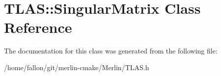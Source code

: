 \hypertarget{classTLAS_1_1SingularMatrix}{}\section{T\+L\+AS\+:\+:Singular\+Matrix Class Reference}
\label{classTLAS_1_1SingularMatrix}


The documentation for this class was generated from the following file\+:\begin{DoxyCompactItemize}
\item 
/home/fallon/git/merlin-\/cmake/\+Merlin/T\+L\+A\+S.\+h\end{DoxyCompactItemize}
